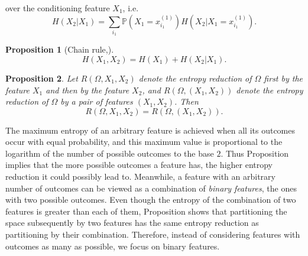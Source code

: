 \documentclass[preprint,authoryear]{elsarticle}
\newtheorem{proposition}{Proposition}
\begin{document}
over the conditioning feature $X_1$, i.e. 
\begin{equation*}
H(X_2|X_1)= \sum_{i_1}  \mathbb{P}(X_1=x^{(1)}_{i_1})  H(X_2|X_1=x^{(1)}_{i_1}).
\end{equation*}
\begin{proposition}[Chain rule,]
	\begin{equation}
	H(X_1,X_2)=H(X_1)+ H(X_2|X_1).
	\end{equation}
\end{proposition}
\begin{proposition}
	Let  $R(\Omega,X_1,X_2)$ denote   the \emph{entropy reduction} of $\Omega$ first by the feature $X_1$ and then by the feature $X_2$, 
	and $R(\Omega,(X_1,X_2))$ denote   the \emph{entropy reduction} of $\Omega$  by a pair of features $(X_1,X_2)$. Then
	\begin{equation}
	R(\Omega,X_1,X_2) = R(\Omega,(X_1,X_2)).
	\end{equation}
\end{proposition}
The maximum entropy of an arbitrary feature is achieved when all  its outcomes   occur with equal probability, 
and this maximum value is proportional to the logarithm of the number of  possible outcomes  to the base $2$.
Thus Proposition  implies that the more possible outcomes  a feature has, 
the higher  entropy reduction it could possibly lead to.
Meanwhile,  a feature with an arbitrary number of outcomes can be viewed as a combination of  \emph{binary features}, 
the ones with two possible outcomes.
Even though the entropy of the combination of two features is greater than  each of them,
Proposition shows that partitioning the space  subsequently  by two features has the same entropy reduction
as partitioning by their combination. 
Therefore, instead of considering features with outcomes as many as possible, we 
focus on binary features.
\end{document}
